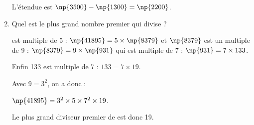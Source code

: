 \begin{enumerate}
L'étendue est $\np{3500} - \np{1300} = \np{2200}$.
\item Quel est le plus grand nombre premier qui divise  ?

 est multiple de 5 : $\np{41895} = 5 \times \np{8379}$ et $\np{8379}$ est un multiple de 9 : $\np{8379} = 9 \times \np{931}$ qui est  multiple de 7 : $\np{931} = 7 \times 133$.

Enfin 133 est multiple de 7  : $133 = 7 \times 19$.

Avec $9 = 3^2$, on a donc :

$\np{41895} = 3^2 \times 5 \times 7^2 \times 19$.

Le plus grand diviseur premier de  est donc 19.
\end{enumerate}
